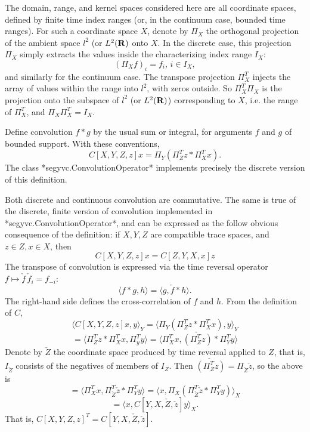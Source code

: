 The domain, range, and kernel spaces considered here are all coordinate spaces, defined by finite time index ranges (or, in the continuum case, bounded time ranges). For such a coordinate space $X$, denote by $\Pi_X$ the orthogonal projection of the ambient space $l^2$ (or $L^2({\bf R})$ onto $X$. In the discrete case, this projection $\Pi_X$ simply extracts the values inside the characterizing index range $I_X$:
$$
(\Pi_X f)_i = f_i, \, i \in I_X,
$$
and similarly for the continuum case. The transpose projection $\Pi_X^T$ injects the array of values within the range into $l^2$, with zeros outside. So $\Pi_X^T\Pi_X$ is the projection onto the subspace of $l^2$ (or $L^2({\bf R})$) corresponding to $X$, i.e. the range of $\Pi_X^T$, and $\Pi_X \Pi_X^T = I_X$.

Define convolution $f*g$ by the usual sum or integral, for arguments $f$ and $g$ of bounded support. With these conventions,
$$
C[X,Y,Z,z]x = \Pi_Y(\Pi_Z^T z * \Pi_X^T x).
$$
The class *segyvc.ConvolutionOperator* implements precisely the discrete version of this definition.

Both discrete and continuous convolution are commutative. The same is true of the discrete, finite version of convolution implemented in *segyvc.ConvolutionOperator*, and can be expressed as the follow obvious consequence of the definition: if $X, Y, Z$ are compatible trace spaces, and $z \in Z, x \in X$, then
\begin{equation}
C[X,Y,Z,z]x = C[Z,Y,X,x]z
\label{eqn:convcomm}
\end{equation}
The transpose of convolution is expressed via the time reversal operator $f \mapsto \check{f}\, \check{f}_i = f_{-i}$:  
$$
\langle f*g,h \rangle = \langle g, \check{f}*h \rangle.
$$ 
The right-hand side defines the cross-correlation of $f$ and $h$. From the definition of $C$,
$$
\langle C[X,Y,Z,z]x, y\rangle_Y = \langle \Pi_Y(\Pi_Z^T z * \Pi_X^T x), y \rangle_Y
$$
$$
= \langle \Pi_Z^T z * \Pi_X^T x, \Pi_y^T y \rangle = \langle \Pi_X^T x, \check{(\Pi_Z^T z)}* \Pi_Y^T y \rangle
$$
Denote by $\check{Z}$ the coordinate space produced by time reversal applied to $Z$, that is, $I_{\check{Z}}$ consists of the negatives of members of $I_Z$. Then $\check{(\Pi_Z^T z)}=\Pi_{\check{Z}}\check{z}$, so the above is
$$
=\langle \Pi_X^T x, \Pi_{\check{Z}}^T \check{z} * \Pi_Y^T y \rangle =\langle x, \Pi_X(\Pi_{\check{Z}}^T \check{z} * \Pi_Y^T y) \rangle_X
$$
$$
= \langle x, C[Y,X,\check{Z},\check{z}]y \rangle_X.
$$
That is, $C[X,Y,Z,z]^T = C[Y,X,\check{Z},\check{z}]$.

